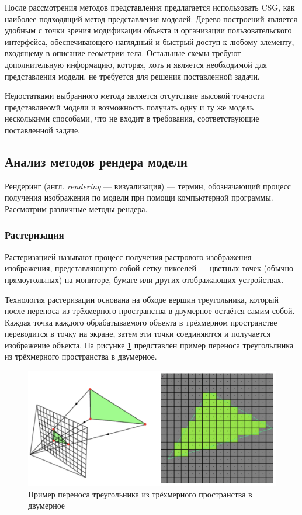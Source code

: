 После рассмотрения методов представления предлагается использовать 
CSG, как наиболее подходящий метод представления моделей.
Дерево построений 
является удобным с точки зрения модификации объекта и организации 
пользовательского интерфейса, обеспечивающего наглядный и быстрый доступ 
к любому элементу, входящему в описание геометрии тела.
Остальные схемы 
требуют дополнительную информацию, которая, хоть и является необходимой 
для представления модели, не требуется для решения поставленной задачи.

Недостатками выбранного метода является отсутствие высокой точности представляеомй модели и возможность получать одну и ту же модель несколькими способами, что не входит в требования, соответствующие поставленной задаче.


\subsection{Анализ методов рендера модели}

Рендеринг (англ. \textit{rendering} --- визуализация) --- термин, обозначающий 
процесс получения изображения по модели при помощи компьютерной 
программы. 
Рассмотрим различные методы рендера.

\subsubsection{Растеризация}

Растеризацией \cite{rasterization} называют процесс получения растрового изображения --- 
изображения, представляющего собой сетку пикселей --- цветных точек 
(обычно прямоугольных) на мониторе, бумаге или других отображающих 
устройствах.

Технология растеризации основана на обходе вершин треугольника, 
который после переноса из трёхмерного пространства в двумерное остаётся 
самим собой.
Каждая точка каждого обрабатываемого объекта в трёхмерном 
пространстве переводится в точку на экране, затем эти точки соединяются и 
получается изображение объекта.
На рисунке \ref{fig:rasterization} представлен пример переноса треугольлника из трёхмерного пространства в двумерное.

\begin{figure}[h]
	\centering
	\captionsetup{justification=centering}
	\includegraphics[width=130mm]{img/rasterization.png}
	\caption{Пример переноса треугольника из трёхмерного 
		пространства в двумерное}
	\label{fig:rasterization}
\end{figure}

